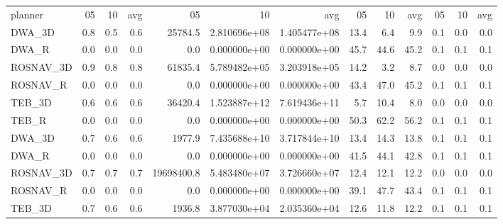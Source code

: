 \begin{tabular}{lrrrrrrrrrrrr}
planner &      05 &      10 &      avg &          05 &     10 &     avg &      05 &    10 &    avg &        05 &    10 &    avg \\
DWA\_3D    &                   0.8 &  0.5 &  0.6 &              25784.5 &  2.810696e+08 &  1.405477e+08 &            13.4 &   6.4 &   9.9 &                 0.1 &  0.0 &  0.0 \\
DWA\_R     &                   0.0 &  0.0 &  0.0 &                  0.0 &  0.000000e+00 &  0.000000e+00 &            45.7 &  44.6 &  45.2 &                 0.1 &  0.1 &  0.1 \\
ROSNAV\_3D &                   0.9 &  0.8 &  0.8 &              61835.4 &  5.789482e+05 &  3.203918e+05 &            14.2 &   3.2 &   8.7 &                 0.0 &  0.0 &  0.0 \\
ROSNAV\_R  &                   0.0 &  0.0 &  0.0 &                  0.0 &  0.000000e+00 &  0.000000e+00 &            43.4 &  47.0 &  45.2 &                 0.1 &  0.1 &  0.1 \\
TEB\_3D    &                   0.6 &  0.6 &  0.6 &              36420.4 &  1.523887e+12 &  7.619436e+11 &             5.7 &  10.4 &   8.0 &                 0.0 &  0.0 &  0.0 \\
TEB\_R     &                   0.0 &  0.0 &  0.0 &                  0.0 &  0.000000e+00 &  0.000000e+00 &            50.3 &  62.2 &  56.2 &                 0.1 &  0.1 &  0.1 \\
DWA\_3D    &                   0.7 &  0.6 &  0.6 &               1977.9 &  7.435688e+10 &  3.717844e+10 &            13.4 &  14.3 &  13.8 &                 0.1 &  0.1 &  0.1 \\
DWA\_R     &                   0.0 &  0.0 &  0.0 &                  0.0 &  0.000000e+00 &  0.000000e+00 &            41.5 &  44.1 &  42.8 &                 0.1 &  0.1 &  0.1 \\
ROSNAV\_3D &                   0.7 &  0.7 &  0.7 &           19698400.8 &  5.483480e+07 &  3.726660e+07 &            12.4 &  12.1 &  12.2 &                 0.0 &  0.0 &  0.0 \\
ROSNAV\_R  &                   0.0 &  0.0 &  0.0 &                  0.0 &  0.000000e+00 &  0.000000e+00 &            39.1 &  47.7 &  43.4 &                 0.1 &  0.1 &  0.1 \\
TEB\_3D    &                   0.7 &  0.6 &  0.6 &               1936.8 &  3.877030e+04 &  2.035360e+04 &            12.6 &  11.8 &  12.2 &                 0.1 &  0.1 &  0.1 \\

\end{tabular}
